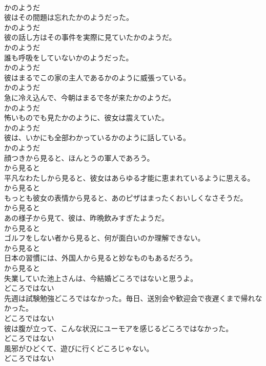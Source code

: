 \documentclass[8pt]{extreport}
\begin{document}
\begin{CJK}{UTF8}{min}
\\	かのようだ
\\	彼はその間題は忘れたかのようだった。	
\\	かのようだ
\\	彼の話し方はその事件を実際に見ていたかのようだ。	
\\	かのようだ
\\	誰も呼吸をしていないかのようだった。	
\\	かのようだ
\\	彼はまるでこの家の主人であるかのように威張っている。	
\\	かのようだ
\\	急に冷え込んで、今朝はまるで冬が来たかのようだ。	
\\	かのようだ
\\	怖いものでも見たかのように、彼女は震えていた。	
\\	かのようだ
\\	彼は、いかにも全部わかっているかのように話している。	
\\	かのようだ
\\	顔つきから見ると、ほんとうの軍人であろう。	
\\	から見ると
\\	平凡なわたしから見ると、彼女はあらゆる才能に恵まれているように思える。	
\\	から見ると
\\	もっとも彼女の表情から見ると、あのピザはまったくおいしくなさそうだ。	
\\	から見ると
\\	あの様子から見て、彼は、昨晩飲みすぎたようだ。	
\\	から見ると
\\	ゴルフをしない者から見ると、何が面白いのか理解できない。	
\\	から見ると
\\	日本の習慣には、外国人から見ると妙なものもあるだろう。	
\\	から見ると
\\	失業していた池上さんは、今結婚どころではないと思うよ。	
\\	どころではない
\\	先週は試験勉強どころではなかった。毎日、送別会や歓迎会で夜遅くまで帰れなかった。	
\\	どころではない
\\	彼は腹が立って、こんな状況にユーモアを感じるどころではなかった。	
\\	どころではない
\\	風邪がひどくて、遊びに行くどころじゃない。	
\\	どころではない

\end{CJK}
\end{document}
